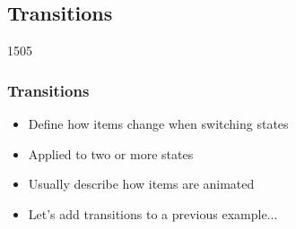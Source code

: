 %
%
%
%


\subsection{Transitions}
\begin{slide}{1505}\frametitle{Transitions}

\begin{itemize}
\item Define how items change when switching states
\item Applied to two or more states
\item Usually describe how items are animated
\end{itemize}

\vspace*{0.5em}

\vspace*{0.5em}
\begin{itemize}
\item Let's add transitions to a previous example...
\end{itemize}


\end{slide}


